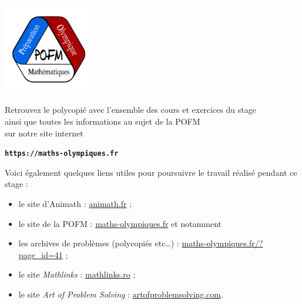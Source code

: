 \thispagestyle{empty}

\mbox{ }

\vfill

\begin{center}
  \includegraphics[width=4cm]{01-Intro/logos/pofm.png}

  \vspace{1cm}

  Retrouvez le polycopié avec l'ensemble des cours et exercices du stage\\
  ainsi que toutes les informations au sujet de la POFM\\
  sur notre site internet

  \smallskip

  \textbf{\texttt{https://maths-olympiques.fr}}

  \bigskip

Voici également quelques liens utiles pour poursuivre le travail réalisé pendant ce stage :
\begin{itemize}
\item le site d'Animath : \href{http://www.animath.fr}{animath.fr} ;
\item le site de la POFM : \href {http://www.maths-olympiques.fr}{maths-olympiques.fr} et notamment
\item les archives de problèmes (polycopiés etc\ldots) : \href{http://www.maths-olympiques.fr/?page_id=41}{maths-olympiques.fr/?page\_id=41} ;
\item le site \emph{Mathlinks} : \href{http://www.mathlinks.ro}{mathlinks.ro} ;
\item le site \emph{Art of Problem Solving} : \href{https://www.artofproblemsolving.com}{artofproblemsolving.com}.
\end{itemize}

\end{center}

\vfill